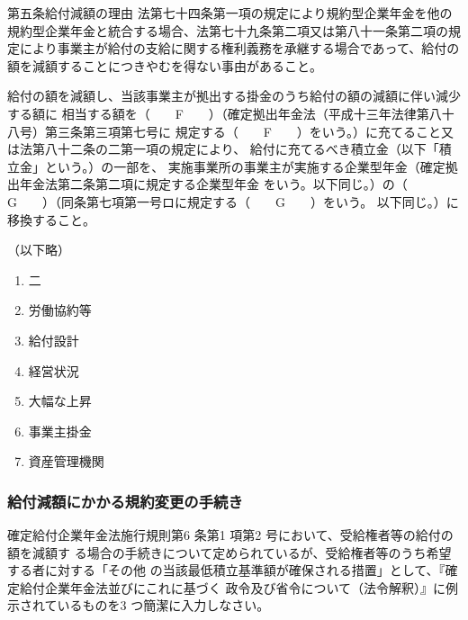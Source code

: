 \begin{fillblank}[数理人試験 \ 2024 \ 問題1 \ 設問2]
\begin{lawstructure}
\begin{lawarticle}{第五条}{給付減額の理由}
        法第七十四条第一項の規定により規約型企業年金を他の規約型企業年金と統合する場合、法第七十九条第二項又は第八十一条第二項の規定により事業主が給付の支給に関する権利義務を承継する場合であって、給付の額を減額することにつきやむを得ない事由があること。

        給付の額を減額し、当該事業主が拠出する掛金のうち給付の額の減額に伴い減少する額に
        相当する額を（　　F　　）（確定拠出年金法（平成十三年法律第八十八号）第三条第三項第七号に
        規定する（　　F　　）をいう。）に充てること又は法第八十二条の二第一項の規定により、
        給付に充てるべき積立金（以下「積立金」という。）の一部を、
        実施事業所の事業主が実施する企業型年金（確定拠出年金法第二条第二項に規定する企業型年金
        をいう。以下同じ。）の（　　G　　）（同条第七項第一号ロに規定する（　　G　　）をいう。
        以下同じ。）に移換すること。

        （以下略）
    \end{lawarticle}
  \end{lawstructure}
\end{fillblank}

\begin{answerbox}
  \begin{enumerate}[A:]
    \item 二
    \item 労働協約等
    \item 給付設計
    \item 経営状況
    \item 大幅な上昇
    \item 事業主掛金
    \item 資産管理機関
  \end{enumerate}  
\end{answerbox}

\subsubsection{給付減額にかかる規約変更の手続き}

\begin{shortanswer}[年金1 \  2022 \ 問題2(1)イ]
  確定給付企業年金法施行規則第6 条第1 項第2 号において、受給権者等の給付の額を減額す
る場合の手続きについて定められているが、受給権者等のうち希望する者に対する「その他
の当該最低積立基準額が確保される措置」として、『確定給付企業年金法並びにこれに基づく
政令及び省令について（法令解釈）』に例示されているものを3 つ簡潔に入力しなさい。
\end{shortanswer}

